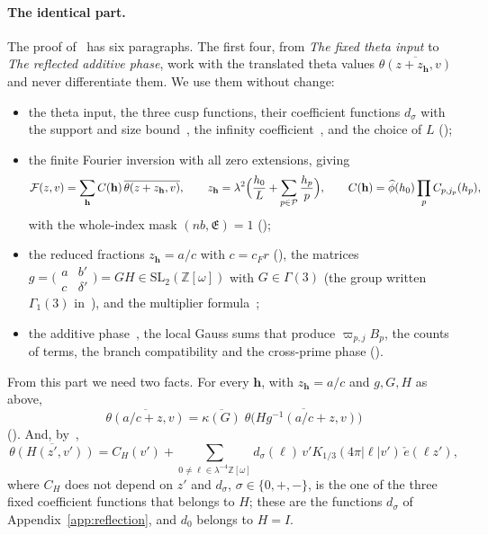 \documentclass[11pt]{article}
\numberwithin{equation}{section}
\newcommand{\OO}{\mathbb Z[\omega]}
\newcommand{\ce}{\check e}
\begin{document}
\paragraph{The identical part.} The proof of~\cite[Prop.~5.1]{OAI78} has six paragraphs. The first four, from
\emph{The fixed theta input} to \emph{The reflected additive phase}, work with the translated theta values $\overline{\theta(z+z_{\mathbf h},v)}$ and
never differentiate them. We use them without change:
\begin{itemize}
\item the theta input, the three cusp functions, their coefficient functions $d_\sigma$ with the support and size
 bound~\cite[eq.~(5.2)]{OAI78}, the infinity coefficient~\cite[eqs.~(5.9) and~(5.10)]{OAI78}, and the choice of $L$ (\cite[proof of Proposition~5.1, \emph{The fixed theta input}]{OAI78});
\item the finite Fourier inversion with all zero extensions, giving
 \begin{equation}\label{eq:d129}
  \mathcal F(z,v)=\sum_{\mathbf h}C(\mathbf h)\,\overline{\theta(z+z_{\mathbf h},v)},\qquad
  z_{\mathbf h}=\lambda^2\Bigl(\frac{h_0}L+\sum_{p\in\mathcal P}\frac{h_p}p\Bigr),\qquad
  C(\mathbf h)=\widehat\phi(h_0)\prod_pC_{p,j_p}(h_p),
 \end{equation}
 with the whole-index mask $(nb,\mathfrak E)=1$ (\cite[proof of Proposition~5.1, \emph{Finite Fourier inversion with the zero extensions}]{OAI78});
\item the reduced fractions $z_{\mathbf h}=a/c$ with $c=c_Fr$ (\cite[proof of Proposition~5.1, \emph{Finite Fourier inversion with the zero extensions}]{OAI78}), the matrices
 $g=\bigl(\begin{smallmatrix}a&b'\\c&\delta'\end{smallmatrix}\bigr)=GH\in\mathrm{SL}_2(\OO)$ with
 $G\in\Gamma(3)$ (the group written $\Gamma_1(3)$ in~\cite{OAI78}), and the multiplier formula~\cite[eq.~(5.15)]{OAI78};
\item the additive phase~\cite[eq.~(5.16)]{OAI78}, the local Gauss sums that produce
 $\varpi_{p,j}B_p$, the counts of terms, the branch compatibility and the cross-prime phase (\cite[proof of Proposition~5.1, \emph{The reflected additive phase}]{OAI78}).
\end{itemize}
From this part we need two facts. For every $\mathbf h$, with $z_{\mathbf h}=a/c$ and $g,G,H$ as above,
\begin{equation}\label{eq:s1-automorphy}
 \overline{\theta(a/c+z,v)}=\overline{\kappa(G)}\;\overline{\theta\bigl(Hg^{-1}(a/c+z,v)\bigr)}
\end{equation}
(\cite[proof of Proposition~5.1, \emph{Mellin normalization and continuation}]{OAI78}). And, by~\cite[eq.~(5.7)]{OAI78},
\begin{equation}\label{eq:d130}
 \overline{\theta(H(z',v'))}=C_H(v')+\sum_{0\ne\ell\in\lambda^{-4}\OO}d_\sigma(\ell)\,v'K_{1/3}(4\pi|\ell|v')\,\ce(\ell z'),
\end{equation}
where $C_H$ does not depend on $z'$ and $d_\sigma$, $\sigma\in\{0,+,-\}$, is the one of the three fixed coefficient
functions that belongs to $H$; these are the functions $d_\sigma$ of Appendix~\ref{app:reflection}, and $d_0$ belongs to
$H=I$.
\end{document}
